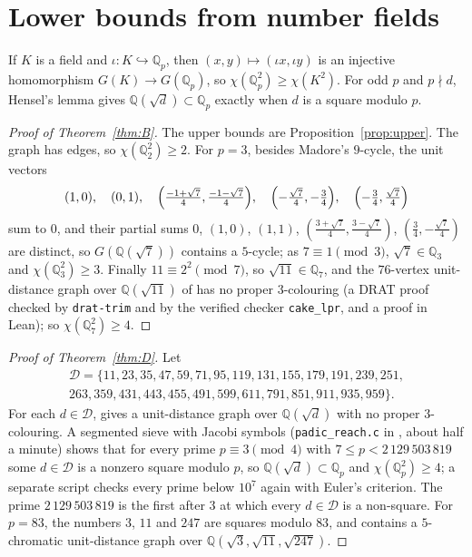 \documentclass[11pt,a4paper]{amsart}
\theoremstyle{remark}
\newcommand{\Q}{\mathbb{Q}}
\begin{document}
\section{Lower bounds from number fields}

If $K$ is a field and $\iota:K\hookrightarrow\Q_p$, then $(x,y)\mapsto(\iota x,\iota y)$ is an injective
homomorphism $G(K)\to G(\Q_p)$, so $\chi(\Q_p^2)\ge\chi(K^2)$. For odd $p$ and $p\nmid d$, Hensel's lemma gives
$\Q(\sqrt d)\subset\Q_p$ exactly when $d$ is a square modulo $p$.

\begin{proof}[Proof of Theorem~\ref{thm:B}]
The upper bounds are Proposition~\ref{prop:upper}. The graph has edges, so $\chi(\Q_2^2)\ge2$. For $p=3$, besides
Madore's $9$-cycle, the unit vectors
\[
(1,0),\quad(0,1),\quad\Bigl(\tfrac{-1+\sqrt7}4,\tfrac{-1-\sqrt7}4\Bigr),\quad
\Bigl(-\tfrac{\sqrt7}4,-\tfrac34\Bigr),\quad\Bigl(-\tfrac34,\tfrac{\sqrt7}4\Bigr)
\]
sum to $0$, and their partial sums $0$, $(1,0)$, $(1,1)$, $(\frac{3+\sqrt7}4,\frac{3-\sqrt7}4)$,
$(\frac34,-\frac{\sqrt7}4)$ are distinct, so $G(\Q(\sqrt7))$ contains a $5$-cycle; as $7\equiv1\pmod3$,
$\sqrt7\in\Q_3$ and $\chi(\Q_3^2)\ge3$. Finally $11\equiv2^2\pmod7$, so $\sqrt{11}\in\Q_7$, and the
$76$-vertex unit-distance graph over $\Q(\sqrt{11})$ of \cite{QP} has no proper $3$-colouring (a DRAT proof
checked by \texttt{drat-trim} and by the verified checker \texttt{cake\_lpr}, and a proof in Lean); so
$\chi(\Q_7^2)\ge4$.
\end{proof}

\begin{proof}[Proof of Theorem~\ref{thm:D}]
Let
\begin{gather*}
\mathcal D=\{11,23,35,47,59,71,95,119,131,155,179,191,239,251,\\
263,359,431,443,455,491,599,611,791,851,911,935,959\}.
\end{gather*}
For each $d\in\mathcal D$, \cite{QP} gives a unit-distance graph over $\Q(\sqrt d)$ with no proper
$3$-colouring. A segmented sieve with Jacobi symbols (\texttt{padic\_reach.c} in \cite{Repo}, about half a
minute) shows that for every prime $p\equiv3\pmod4$ with $7\le p<2\,129\,503\,819$ some $d\in\mathcal D$ is a
nonzero square modulo $p$, so $\Q(\sqrt d)\subset\Q_p$ and $\chi(\Q_p^2)\ge4$; a separate script checks every
prime below $10^7$ again with Euler's criterion. The prime $2\,129\,503\,819$ is the first after $3$ at which every
$d\in\mathcal D$ is a non-square. For $p=83$, the numbers $3$, $11$ and $247$ are squares modulo $83$, and
\cite{Repo} contains a $5$-chromatic unit-distance graph over $\Q(\sqrt3,\sqrt{11},\sqrt{247})$.
\end{proof}
\end{document}
